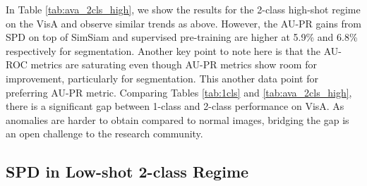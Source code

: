 In Table \ref{tab:ava_2cls_high}, we show the results for the 2-class high-shot regime on the VisA and observe similar trends as above. However, the AU-PR gains from SPD on top of SimSiam and supervised pre-training are higher at 5.9\% and 6.8\% respectively for segmentation. Another key point to note here is that the AU-ROC metrics are saturating even though AU-PR metrics show room for improvement, particularly for segmentation. This another data point for preferring AU-PR metric. 
Comparing Tables \ref{tab:1cls} and \ref{tab:ava_2cls_high}, there is a significant gap between 1-class and 2-class performance on VisA. As anomalies are harder to obtain compared to normal images, bridging the gap is an open challenge to the research community.

\subsection{SPD in Low-shot 2-class Regime}\label{sect:few-shot-results}


